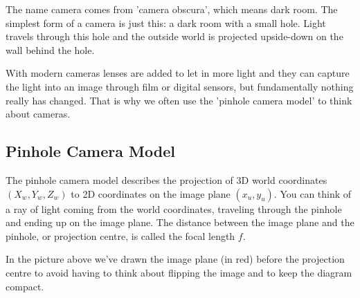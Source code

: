\documentclass{article}[a4paper]
\begin{document}
The name camera comes from 'camera obscura', which means dark room. 
The simplest form of a camera is just this: a dark room with a small hole. 
Light travels through this hole and the outside world is projected upside-down on the wall behind the hole.

With modern cameras lenses are added to let in more light and they can capture the light into an image through film or digital sensors, but fundamentally nothing really has changed.
That is why we often use the 'pinhole camera model' to think about cameras.

\subsection{Pinhole Camera Model}

\begin{center}
\end{center}

The pinhole camera model describes the projection of 3D world coordinates $(X_w, Y_w, Z_w)$ to 2D coordinates on the image plane $(x_u, y_u)$. You can think of a ray of light coming from the world coordinates, traveling through the pinhole and ending up on the image plane. The distance between the image plane and the pinhole, or projection centre, is called the focal length $f$.

In the picture above we've drawn the image plane (in red) before the projection centre to avoid having to think about flipping the image and to keep the diagram compact.
\end{document}
